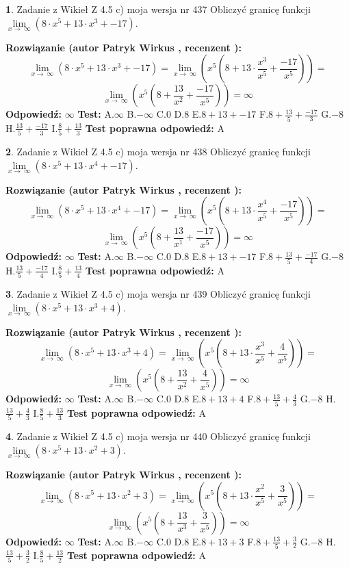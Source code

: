 \documentclass[12pt, a4paper]{article}
\theoremstyle{definition} %
\newtheorem{zad}{}
\newcommand{\zadStart}[1]{\begin{zad}#1\newline}
\newcommand{\zadStop}{\end{zad}}
\newcommand{\rozwStart}[2]{\noindent \textbf{Rozwiązanie (autor #1 , recenzent #2): }\newline}
\newcommand{\rozwStop}{\newline}
\newcommand{\odpStart}{\noindent \textbf{Odpowiedź:}\newline}
\newcommand{\odpStop}{\newline}
\newcommand{\testStart}{\noindent \textbf{Test:}\newline}
\newcommand{\testStop}{\newline}
\newcommand{\kluczStart}{\noindent \textbf{Test poprawna odpowiedź:}\newline}
\newcommand{\kluczStop}{\newline}
\begin{document}
\zadStart{Zadanie z Wikieł Z 4.5 c) moja wersja nr 437}
Obliczyć granicę funkcji  $\lim\limits_{x\to\ \infty}(8 \cdot x^{5}+13 \cdot x^{3}+-17)$.
\zadStop
\rozwStart{Patryk Wirkus}{}
$$\lim\limits_{x\to\ \infty}(8 \cdot x^{5}+13 \cdot x^{3}+-17) = \lim\limits_{x\to\ \infty}(x^{5}(8 +13 \cdot \frac{x^{3}}{x^{5}}+\frac{-17}{x^{5}})) =$$ $$\lim\limits_{x\to\ \infty}(x^{5}(8 +\frac{13}{x^{2}}+\frac{-17}{x^{5}})) =\infty$$
\rozwStop
\odpStart
$\infty$
\odpStop
\testStart
A.$\infty$ B.$-\infty$ C.$0$ D.$8$ E.$8 + 13 + -17$
F.$8+\frac{13}{5}+\frac{-17}{3}$ G.$-8$
H.$\frac{13}{5}+\frac{-17}{3}$
I.$\frac{8}{5}+\frac{13}{3}$
\testStop
\kluczStart
A
\kluczStop



\zadStart{Zadanie z Wikieł Z 4.5 c) moja wersja nr 438}
Obliczyć granicę funkcji  $\lim\limits_{x\to\ \infty}(8 \cdot x^{5}+13 \cdot x^{4}+-17)$.
\zadStop
\rozwStart{Patryk Wirkus}{}
$$\lim\limits_{x\to\ \infty}(8 \cdot x^{5}+13 \cdot x^{4}+-17) = \lim\limits_{x\to\ \infty}(x^{5}(8 +13 \cdot \frac{x^{4}}{x^{5}}+\frac{-17}{x^{5}})) =$$ $$\lim\limits_{x\to\ \infty}(x^{5}(8 +\frac{13}{x^{1}}+\frac{-17}{x^{5}})) =\infty$$
\rozwStop
\odpStart
$\infty$
\odpStop
\testStart
A.$\infty$ B.$-\infty$ C.$0$ D.$8$ E.$8 + 13 + -17$
F.$8+\frac{13}{5}+\frac{-17}{4}$ G.$-8$
H.$\frac{13}{5}+\frac{-17}{4}$
I.$\frac{8}{5}+\frac{13}{4}$
\testStop
\kluczStart
A
\kluczStop



\zadStart{Zadanie z Wikieł Z 4.5 c) moja wersja nr 439}
Obliczyć granicę funkcji  $\lim\limits_{x\to\ \infty}(8 \cdot x^{5}+13 \cdot x^{3}+4)$.
\zadStop
\rozwStart{Patryk Wirkus}{}
$$\lim\limits_{x\to\ \infty}(8 \cdot x^{5}+13 \cdot x^{3}+4) = \lim\limits_{x\to\ \infty}(x^{5}(8 +13 \cdot \frac{x^{3}}{x^{5}}+\frac{4}{x^{5}})) =$$ $$\lim\limits_{x\to\ \infty}(x^{5}(8 +\frac{13}{x^{2}}+\frac{4}{x^{5}})) =\infty$$
\rozwStop
\odpStart
$\infty$
\odpStop
\testStart
A.$\infty$ B.$-\infty$ C.$0$ D.$8$ E.$8 + 13 + 4$
F.$8+\frac{13}{5}+\frac{4}{3}$ G.$-8$
H.$\frac{13}{5}+\frac{4}{3}$
I.$\frac{8}{5}+\frac{13}{3}$
\testStop
\kluczStart
A
\kluczStop



\zadStart{Zadanie z Wikieł Z 4.5 c) moja wersja nr 440}
Obliczyć granicę funkcji  $\lim\limits_{x\to\ \infty}(8 \cdot x^{5}+13 \cdot x^{2}+3)$.
\zadStop
\rozwStart{Patryk Wirkus}{}
$$\lim\limits_{x\to\ \infty}(8 \cdot x^{5}+13 \cdot x^{2}+3) = \lim\limits_{x\to\ \infty}(x^{5}(8 +13 \cdot \frac{x^{2}}{x^{5}}+\frac{3}{x^{5}})) =$$ $$\lim\limits_{x\to\ \infty}(x^{5}(8 +\frac{13}{x^{3}}+\frac{3}{x^{5}})) =\infty$$
\rozwStop
\odpStart
$\infty$
\odpStop
\testStart
A.$\infty$ B.$-\infty$ C.$0$ D.$8$ E.$8 + 13 + 3$
F.$8+\frac{13}{5}+\frac{3}{2}$ G.$-8$
H.$\frac{13}{5}+\frac{3}{2}$
I.$\frac{8}{5}+\frac{13}{2}$
\testStop
\kluczStart
A
\kluczStop
\end{document}
